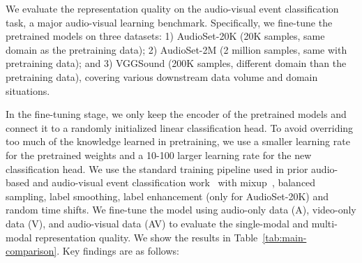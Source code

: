 \documentclass{article} \usepackage{iclr2023_conference,times}
\begin{document}
We evaluate the representation quality on the audio-visual event classification task, a major audio-visual learning benchmark. Specifically, we fine-tune the pretrained models on three datasets: 1) AudioSet-20K (20K samples, same domain as the pretraining data); 2) AudioSet-2M (2 million samples, same with pretraining data); and 3) VGGSound (200K samples, different domain than the pretraining data), covering various downstream data volume and domain situations. 

In the fine-tuning stage, we only keep the encoder of the pretrained models and connect it to a randomly initialized linear classification head. To avoid overriding too much of the knowledge learned in pretraining, we use a smaller learning rate for the pretrained weights and a 10-100 larger learning rate for the new classification head. We use the standard training pipeline used in prior audio-based and audio-visual event classification work~\cite{gong21b_interspeech,gong_psla,nagrani2021attention} with mixup~\cite{zhang2018mixup}, balanced sampling, label smoothing, label enhancement (only for AudioSet-20K) and random time shifts. We fine-tune the model using audio-only data (A), video-only data (V), and audio-visual data (AV) to evaluate the single-modal and multi-modal representation quality. We show the results in Table~\ref{tab:main-comparison}. Key findings are as follows:
\end{document}
